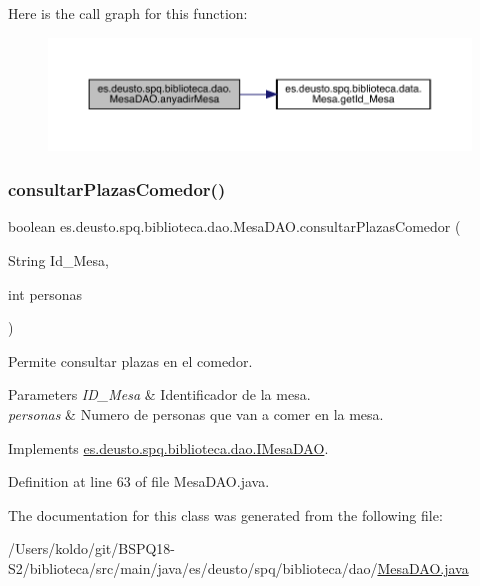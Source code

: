 Here is the call graph for this function\+:
\nopagebreak
\begin{figure}[H]
\begin{center}
\leavevmode
\includegraphics[width=350pt]{classes_1_1deusto_1_1spq_1_1biblioteca_1_1dao_1_1_mesa_d_a_o_aea7e6b72ca52e203015e78fa9f7d3817_cgraph}
\end{center}
\end{figure}
\mbox{\label{classes_1_1deusto_1_1spq_1_1biblioteca_1_1dao_1_1_mesa_d_a_o_a7631ebe9a7d3215db433ac29bb3e75c4}} 
\subsubsection{\texorpdfstring{consultar\+Plazas\+Comedor()}{consultarPlazasComedor()}}
{\footnotesize\ttfamily boolean es.\+deusto.\+spq.\+biblioteca.\+dao.\+Mesa\+D\+A\+O.\+consultar\+Plazas\+Comedor (\begin{DoxyParamCaption}\item[{String}]{Id\+\_\+\+Mesa,  }\item[{int}]{personas }\end{DoxyParamCaption})}

Permite consultar plazas en el comedor. 
\begin{DoxyParams}{Parameters}
{\em I\+D\+\_\+\+Mesa} & Identificador de la mesa. \\
\hline
{\em personas} & Numero de personas que van a comer en la mesa. \\
\hline
\end{DoxyParams}


Implements \mbox{\hyperlink{interfacees_1_1deusto_1_1spq_1_1biblioteca_1_1dao_1_1_i_mesa_d_a_o_a82ff152d68c25134fdffa41a1b08a347}{es.\+deusto.\+spq.\+biblioteca.\+dao.\+I\+Mesa\+D\+AO}}.



Definition at line 63 of file Mesa\+D\+A\+O.\+java.



The documentation for this class was generated from the following file\+:\begin{DoxyCompactItemize}
\item 
/\+Users/koldo/git/\+B\+S\+P\+Q18-\/\+S2/biblioteca/src/main/java/es/deusto/spq/biblioteca/dao/\mbox{\hyperlink{_mesa_d_a_o_8java}{Mesa\+D\+A\+O.\+java}}\end{DoxyCompactItemize}
